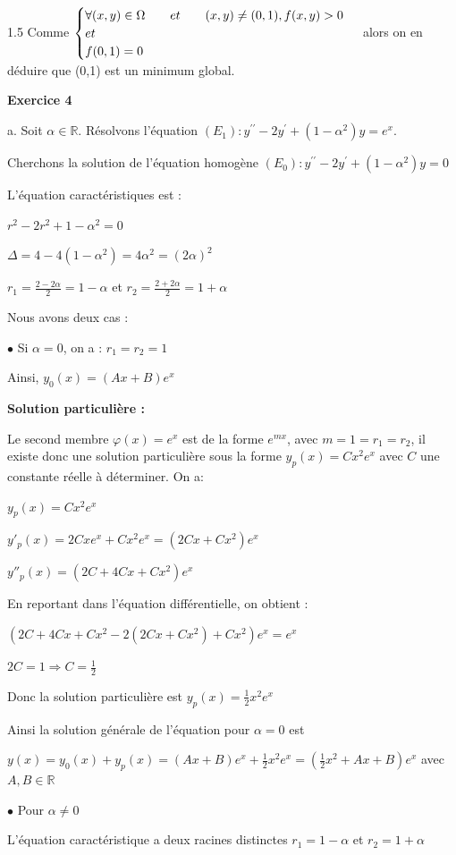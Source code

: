 \documentclass[12pt]{article}
\begin{document}
\begin{spacing}{1.5}
Comme $\begin{cases}
\forall (x,y)\in\Omega\hspace{0.7cm} et\hspace{0.7cm} (x,y)\neq(0,1), f(x,y)>0\\
et\\
f(0,1)=0
\end{cases}$ alors on en déduire que (0,1) est un minimum global.

\medskip\textbf{Exercice 4}

a. Soit $\alpha\in \mathbb{R}$. Résolvons l'équation $(E_1):y^{\prime\prime} -2y^{\prime} +(1-\alpha^2)y=e^x$.

Cherchons la solution de l'équation homogène $(E_0) : y^{\prime\prime} -2y^{\prime} +(1-\alpha^2)y=0$

L'équation caractéristiques est :

$r^2-2r^2+1-\alpha^2=0$

$\Delta = 4-4(1-\alpha^2)=4\alpha^2=(2\alpha)^2$

$r_1=\frac{2-2\alpha}{2}=1-\alpha$ et $r_2=\frac{2+2\alpha}{2}=1+\alpha$

Nous avons deux cas :

$\bullet$ Si $\alpha=0$, on a : $r_1=r_2=1$

Ainsi, $y_0(x)=(Ax+B)e^x$

\textbf{Solution particulière :}

Le second membre $\varphi (x)=e^x$ est de la forme $e^{mx}$, avec  $m=1=r_1=r_2$, il existe donc une solution particulière sous la forme $y_p(x)=Cx^2e^x$ avec $C$ une constante réelle à déterminer. On a:

$y_p(x)=Cx^2e^x$

$y'_p(x)=2Cxe^x+Cx^2e^x=(2Cx+Cx^2)e^x$

$y''_p(x)=(2C+4Cx+Cx^2)e^x$

En reportant dans l'équation différentielle, on obtient :

$(2C+4Cx+Cx^2-2(2Cx+Cx^2)+Cx^2)e^x=e^x$

$2C=1\Rightarrow C=\frac{1}{2}$

Donc la solution particulière est $y_p(x)=\frac{1}{2}x^2e^x$

Ainsi la solution générale de l'équation pour $\alpha=0$ est  

$y(x)=y_0(x)+y_p(x)=(Ax+B)e^x+ \frac{1}{2}x^2e^x=(\frac{1}{2}x^2+Ax+B)e^x$ avec $A,B\in \mathbb{R}$

\medskip
$\bullet$ Pour $\alpha\neq 0$

L'équation caractéristique a deux racines distinctes $r_1=1-\alpha$ et $r_2=1+\alpha$


\end{spacing}
\end{document}

